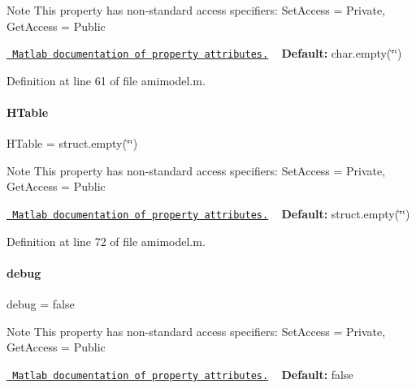 \begin{DoxyNote}{Note}
This property has non-\/standard access specifiers\+: {\ttfamily Set\+Access = Private, Get\+Access = Public} 

\href{http://www.mathworks.com/help/matlab/matlab_oop/property-attributes.html}{\texttt{ Matlab documentation of property attributes.}} ~\newline
{\bfseries{Default\+:}} char.\+empty(\char`\"{}\char`\"{}) 
\end{DoxyNote}


Definition at line 61 of file amimodel.\+m.

\mbox{\label{classamimodel_aafe6335df413dd688a2f44efba012cf1}} 
\paragraph{\texorpdfstring{HTable}{HTable}}
{\footnotesize\ttfamily H\+Table = struct.\+empty(\char`\"{}\char`\"{})}

\begin{DoxyNote}{Note}
This property has non-\/standard access specifiers\+: {\ttfamily Set\+Access = Private, Get\+Access = Public} 

\href{http://www.mathworks.com/help/matlab/matlab_oop/property-attributes.html}{\texttt{ Matlab documentation of property attributes.}} ~\newline
{\bfseries{Default\+:}} struct.\+empty(\char`\"{}\char`\"{}) 
\end{DoxyNote}


Definition at line 72 of file amimodel.\+m.

\mbox{\label{classamimodel_a0514aabed091ee5e2f35766eb01eced6}} 
\paragraph{\texorpdfstring{debug}{debug}}
{\footnotesize\ttfamily debug = false}

\begin{DoxyNote}{Note}
This property has non-\/standard access specifiers\+: {\ttfamily Set\+Access = Private, Get\+Access = Public} 

\href{http://www.mathworks.com/help/matlab/matlab_oop/property-attributes.html}{\texttt{ Matlab documentation of property attributes.}} ~\newline
{\bfseries{Default\+:}} false 
\end{DoxyNote}


